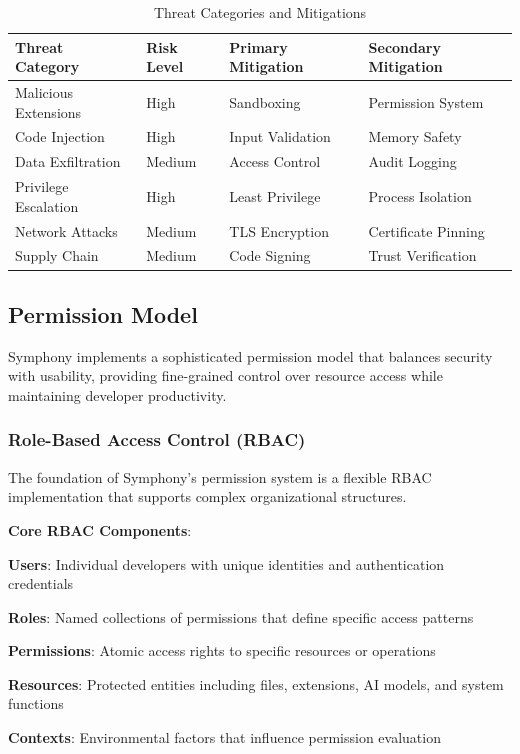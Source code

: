 \begin{table}[h]
\centering
\caption{Threat Categories and Mitigations}
\label{tab:threat-model}
\begin{tabular}{@{}llll@{}}
\toprule
\textbf{Threat Category} & \textbf{Risk Level} & \textbf{Primary Mitigation} & \textbf{Secondary Mitigation} \\
\midrule
Malicious Extensions & High & Sandboxing & Permission System \\
Code Injection & High & Input Validation & Memory Safety \\
Data Exfiltration & Medium & Access Control & Audit Logging \\
Privilege Escalation & High & Least Privilege & Process Isolation \\
Network Attacks & Medium & TLS Encryption & Certificate Pinning \\
Supply Chain & Medium & Code Signing & Trust Verification \\
\bottomrule
\end{tabular}
\end{table}

\subsection*{Permission Model}

Symphony implements a sophisticated permission model that balances security with usability, providing fine-grained control over resource access while maintaining developer productivity.

\subsubsection*{Role-Based Access Control (RBAC)}

The foundation of Symphony's permission system is a flexible RBAC implementation that supports complex organizational structures.

\textbf{Core RBAC Components}:
\begin{expandedlist}
    \item \textbf{Users}: Individual developers with unique identities and authentication credentials
    \item \textbf{Roles}: Named collections of permissions that define specific access patterns
    \item \textbf{Permissions}: Atomic access rights to specific resources or operations
    \item \textbf{Resources}: Protected entities including files, extensions, AI models, and system functions
    \item \textbf{Contexts}: Environmental factors that influence permission evaluation
\end{expandedlist}

